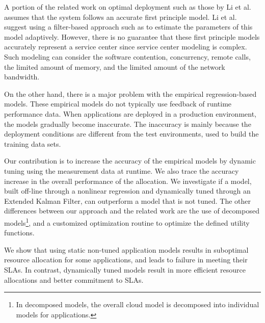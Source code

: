 A portion of the related work on optimal deployment such as those by Li et al.\cite{li_fast_2009,li_performance_2009} assumes that the system follows an accurate first principle model. Li et al. suggest using a filter-based approach such as \cite{zheng-integrated-2011} to estimate the parameters of this model adaptively. 
However, there is no guarantee that these first principle models accurately represent a service center since service center modeling is complex. Such modeling can consider the software contention, concurrency, remote calls, the limited amount of memory, and the limited amount of the network bandwidth.  

On the other hand, there is a major problem with the empirical regression-based models. 
These empirical models do not typically use feedback of runtime performance data. 
When applications are deployed in a production environment, the models gradually become inaccurate. The inaccuracy is mainly because the deployment conditions are different from the test environments, used to build the training data sets.  
 
Our contribution is to increase the accuracy of the empirical models by dynamic tuning using the measurement data at runtime. We also trace the accuracy increase in the overall performance of the allocation. We investigate if a model, built off-line through a nonlinear regression and dynamically tuned through an Extended Kalman Filter, can outperform a model that is not tuned. The other differences between our approach and the related work are the use of decomposed models\footnote{In decomposed models, the overall cloud model is decomposed into individual models for applications.}, and a customized optimization routine to optimize the defined utility functions.   


We show that using static non-tuned application models results in suboptimal resource allocation for some applications, and leads to failure in meeting their SLAs. In contrast, dynamically tuned models result in more efficient resource allocations and better commitment to SLAs.%



